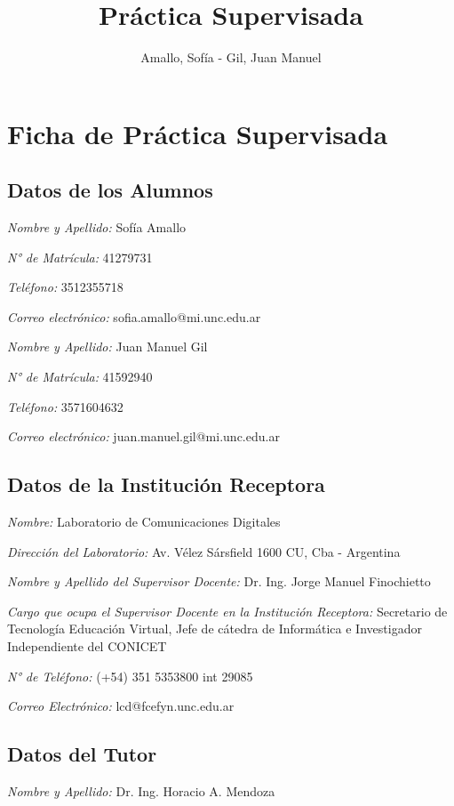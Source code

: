 \documentclass[12pt]{article}
\title{\huge Práctica Supervisada\vspace*{5cm}}
\author{Amallo, Sofía - Gil, Juan Manuel}
\date{\parbox{\linewidth}{\centering%
  Noviembre 18, 2022 \endgraf\bigskip
  \vspace*{4cm}
  Dr. Ing. Horacio A. Mendoza \hspace*{1cm} Dr. Ing. Jorge Finochietto\endgraf\medskip
  \vspace*{0.5cm}
  Laboratorio de\ Comunicaciones Digitales \endgraf
  Universidad Nacional de Córdoba}}
\begin{document}
\maketitle

\newpage

\section{Ficha de Práctica Supervisada}
\subsection{Datos de los Alumnos}
\raggedright
\textsl{Nombre y Apellido:}  Sofía Amallo

\textsl{N° de Matrícula:} 41279731

\textsl{Teléfono:} 3512355718

\textsl{Correo electrónico:} sofia.amallo@mi.unc.edu.ar
\vspace*{0.5cm}

\textsl{Nombre y Apellido:} Juan Manuel Gil

\textsl{N° de Matrícula:} 41592940

\textsl{Teléfono:} 3571604632

\textsl{Correo electrónico:} juan.manuel.gil@mi.unc.edu.ar

\subsection{Datos de la Institución Receptora}
\textsl{Nombre:} Laboratorio de Comunicaciones Digitales

\textsl{Dirección del Laboratorio:} Av. Vélez Sársfield 1600 CU, Cba - Argentina

\textsl{Nombre y Apellido del Supervisor Docente:} Dr. Ing. Jorge Manuel Finochietto

\textsl{Cargo que ocupa el Supervisor Docente en la Institución Receptora:} Secretario de Tecnología  Educación Virtual, Jefe de cátedra de Informática e Investigador Independiente del CONICET

\textsl{N° de Teléfono:} (+54) 351 5353800 int 29085

\textsl{Correo Electrónico:} lcd@fcefyn.unc.edu.ar

\subsection{Datos del Tutor}

\textsl{Nombre y Apellido:} Dr. Ing. Horacio A. Mendoza
\end{document}
